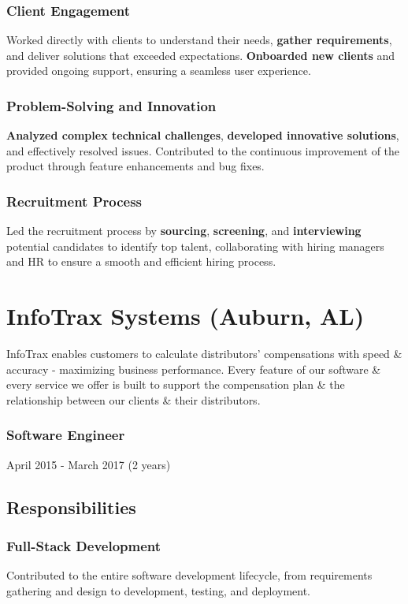 \documentclass[letterpaper,9pt]{article}
\begin{document}
	\subsubsection{Client Engagement}{Worked directly with clients to understand their needs, \textbf{gather requirements}, and deliver solutions that exceeded expectations. \textbf{Onboarded new clients} and provided ongoing support, ensuring a seamless user experience.}
	\subsubsection{Problem-Solving and Innovation}{\textbf{Analyzed complex technical challenges}, \textbf{developed innovative solutions}, and effectively resolved issues. Contributed to the continuous improvement of the product through feature enhancements and bug fixes.}
	\subsubsection{Recruitment Process}{Led the recruitment process by \textbf{sourcing}, \textbf{screening}, and \textbf{interviewing} potential candidates to identify top talent, collaborating with hiring managers and HR to ensure a smooth and efficient hiring process.}
	
	\pagebreak


    \section{InfoTrax Systems (Auburn, AL)}{
    	InfoTrax enables customers to calculate distributors’ compensations with speed \& accuracy - maximizing business performance. Every feature of our software \& every service we offer is built to support the compensation plan \& the relationship between our clients \& their distributors.}
    \subsubsection{Software Engineer}{April 2015 - March 2017 (2 years)}
    \subsection{Responsibilities}
    \subsubsection{Full-Stack Development}{Contributed to the entire software development lifecycle, from requirements gathering and design to development, testing, and deployment.}
\end{document}
